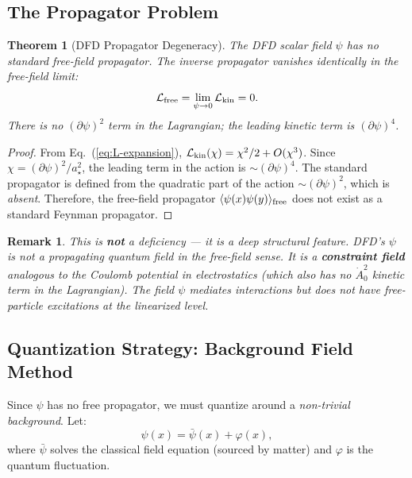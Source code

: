 \documentclass[11pt,a4paper]{article}
\newtheorem{theorem}{Theorem}
\newtheorem{remark}{Remark}
\begin{document}
\subsection{The Propagator Problem}
\label{sec:propagator}

\begin{theorem}[DFD Propagator Degeneracy]
The DFD scalar field $\psi$ has no standard free-field propagator. The inverse propagator vanishes identically in the free-field limit:
\begin{equation}
\mathcal{L}_{\rm free} = \lim_{\psi\to 0} \mathcal{L}_{\rm kin} = 0.
\end{equation}
There is no $(\partial\psi)^2$ term in the Lagrangian; the leading kinetic term is $(\partial\psi)^4$.
\end{theorem}

\begin{proof}
From Eq.~(\ref{eq:L-expansion}), $\mathcal{L}_{\rm kin}(\chi) = \chi^2/2 + O(\chi^3)$. Since $\chi = (\partial\psi)^2/a_\star^2$, the leading term in the action is $\sim (\partial\psi)^4$. The standard propagator is defined from the quadratic part of the action $\sim (\partial\psi)^2$, which is \emph{absent}. Therefore, the free-field propagator $\langle \psi(x)\psi(y)\rangle_{\rm free}$ does not exist as a standard Feynman propagator.
\end{proof}

\begin{remark}
This is \textbf{not} a deficiency --- it is a deep structural feature. DFD's $\psi$ is not a propagating quantum field in the free-field sense. It is a \textbf{constraint field} analogous to the Coulomb potential in electrostatics (which also has no $\dot{A}_0^2$ kinetic term in the Lagrangian). The field $\psi$ mediates interactions but does not have free-particle excitations at the linearized level.
\end{remark}

\subsection{Quantization Strategy: Background Field Method}
\label{sec:background-field}

Since $\psi$ has no free propagator, we must quantize around a \emph{non-trivial background}. Let:
\begin{equation}\label{eq:background-split}
\psi(x) = \bar{\psi}(x) + \varphi(x),
\end{equation}
where $\bar{\psi}$ solves the classical field equation (sourced by matter) and $\varphi$ is the quantum fluctuation.
\end{document}
